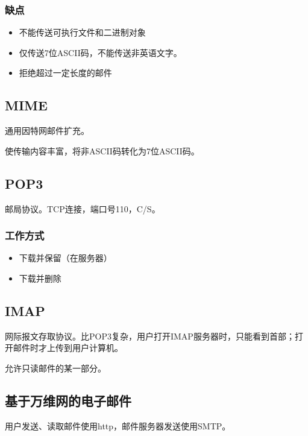 \subsubsection{缺点}
\begin{itemize}
    \item 不能传送可执行文件和二进制对象
    \item 仅传送7位ASCII码，不能传送非英语文字。
    \item 拒绝超过一定长度的邮件
\end{itemize}


\subsection{MIME}
通用因特网邮件扩充。

使传输内容丰富，将非ASCII码转化为7位ASCII码。


\subsection{POP3}
邮局协议。TCP连接，端口号110，C/S。

\subsubsection{工作方式}
\begin{itemize}
    \item 下载并保留（在服务器）
    \item 下载并删除
\end{itemize}


\subsection{IMAP}
网际报文存取协议。比POP3复杂，用户打开IMAP服务器时，只能看到首部；打开邮件时才上传到用户计算机。

允许只读邮件的某一部分。


\subsection{基于万维网的电子邮件}
用户发送、读取邮件使用http，邮件服务器发送使用SMTP。

